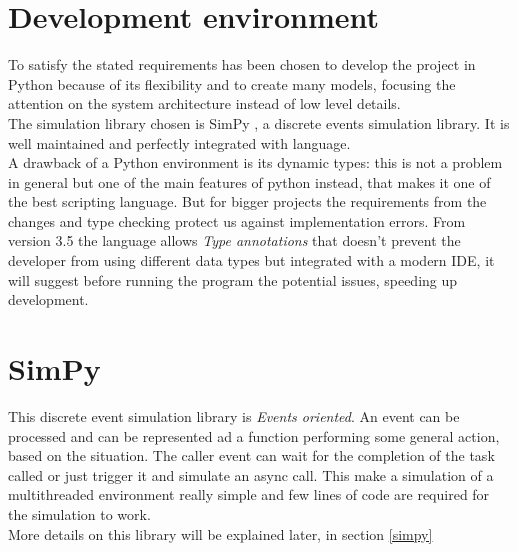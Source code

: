 \section{Development environment}
To satisfy the stated requirements has been chosen to develop the project in Python
because of its flexibility and to create many models, focusing the attention on the
system architecture instead of low level details. \\
The simulation library chosen is SimPy \cite{simpy}, a discrete events
simulation library. It is well maintained and perfectly integrated with
language. \\
A drawback of a Python environment is its dynamic types: this is not a problem
in general but one of the main features of python instead, that makes it one of
the best scripting language. But for bigger projects the requirements from the
changes and type checking protect us against implementation errors. From version
3.5 the language allows \textit{Type annotations} that doesn't prevent the
developer from using different data types but integrated with a modern IDE, it
will suggest before running the program the potential issues, speeding up
development.

\section{SimPy}
This discrete event simulation library is \textit{Events oriented}. An event can
be processed and can be represented ad a function performing some general
action, based on the situation. The caller event can wait for the completion of
the task called or just trigger it and simulate an async call. This make a
simulation of a multithreaded environment really simple and few lines of code
are required for the simulation to work. \\
More details on this library will be explained later, in section \ref{simpy}

